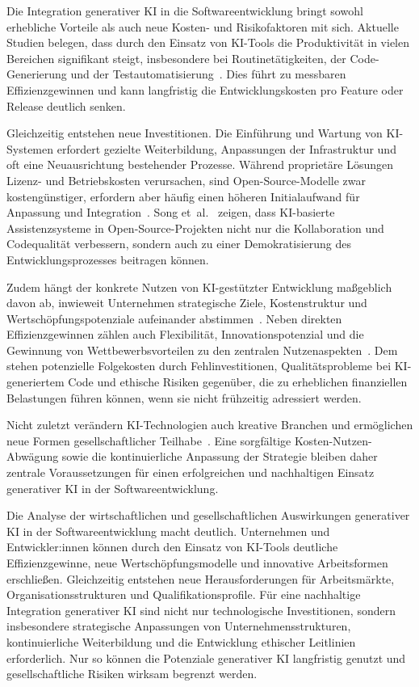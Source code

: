 
Die Integration generativer KI in die Softwareentwicklung bringt sowohl
erhebliche Vorteile als auch neue Kosten- und Risikofaktoren mit sich. Aktuelle
Studien belegen, dass durch den Einsatz von KI-Tools die Produktivität in
vielen Bereichen signifikant steigt, insbesondere bei Routinetätigkeiten, der
Code-Generierung und der Testautomatisierung~\cite{marguerit_augmenting_2025,
    farach_evolving_2025, habibi_open_2025}. Dies führt zu messbaren
Effizienzgewinnen und kann langfristig die Entwicklungskosten pro Feature oder
Release deutlich senken.

Gleichzeitig entstehen neue Investitionen. Die Einführung und Wartung von
KI-Systemen erfordert gezielte Weiterbildung, Anpassungen der Infrastruktur und
oft eine Neuausrichtung bestehender Prozesse. Während proprietäre Lösungen
Lizenz- und Betriebskosten verursachen, sind Open-Source-Modelle zwar
kostengünstiger, erfordern aber häufig einen höheren Initialaufwand für
Anpassung und Integration~\cite{habibi_open_2025}. Song
et~al.~\cite{song_impact_2024} zeigen, dass KI-basierte Assistenzsysteme in
Open-Source-Projekten nicht nur die Kollaboration und Codequalität verbessern,
sondern auch zu einer Demokratisierung des Entwicklungsprozesses beitragen
können.

Zudem hängt der konkrete Nutzen von KI-gestützter Entwicklung maßgeblich davon
ab, inwieweit Unternehmen strategische Ziele, Kostenstruktur und
Wertschöpfungspotenziale aufeinander
abstimmen~\cite{mcnamara_exponential_2025}. Neben direkten Effizienzgewinnen
zählen auch Flexibilität, Innovationspotenzial und die Gewinnung von
Wettbewerbsvorteilen zu den zentralen
Nutzenaspekten~\cite{storey_generative_2025}. Dem stehen potenzielle
Folgekosten durch Fehlinvestitionen, Qualitätsprobleme bei KI-generiertem Code
und ethische Risiken gegenüber, die zu erheblichen finanziellen Belastungen
führen können, wenn sie nicht frühzeitig adressiert werden.

Nicht zuletzt verändern KI-Technologien auch kreative Branchen und ermöglichen
neue Formen gesellschaftlicher Teilhabe~\cite{anantrasirichai_artificial_2025}.
Eine sorgfältige Kosten-Nutzen-Abwägung sowie die kontinuierliche Anpassung der
Strategie bleiben daher zentrale Voraussetzungen für einen erfolgreichen und
nachhaltigen Einsatz generativer KI in der Softwareentwicklung.

Die Analyse der wirtschaftlichen und gesellschaftlichen Auswirkungen
generativer KI in der Softwareentwicklung macht deutlich. Unternehmen und
Entwickler:innen können durch den Einsatz von KI-Tools deutliche
Effizienzgewinne, neue Wertschöpfungsmodelle und innovative Arbeitsformen
erschließen. Gleichzeitig entstehen neue Herausforderungen für Arbeitsmärkte,
Organisationsstrukturen und Qualifikationsprofile. Für eine nachhaltige
Integration generativer KI sind nicht nur technologische Investitionen, sondern
insbesondere strategische Anpassungen von Unternehmensstrukturen,
kontinuierliche Weiterbildung und die Entwicklung ethischer Leitlinien
erforderlich. Nur so können die Potenziale generativer KI langfristig genutzt
und gesellschaftliche Risiken wirksam begrenzt werden.

